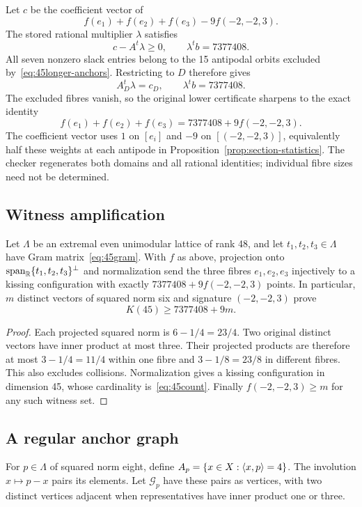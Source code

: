 Let $c$ be the coefficient vector of
\[
f(e_1)+f(e_2)+f(e_3)-9f(-2,-2,3).
\]
The stored rational multiplier $\lambda$ satisfies
\begin{equation}\label{eq:45dual}
c-A^t\lambda\ge0,\qquad \lambda^tb=7377408.
\end{equation}
All seven nonzero slack entries belong to the 15 antipodal orbits
excluded by~\eqref{eq:45longer-anchors}. Restricting to $D$ therefore gives
\[
A_D^t\lambda=c_D,\qquad\lambda^tb=7377408.
\]
The excluded fibres vanish, so the original lower certificate sharpens
to the exact identity
\begin{equation}\label{eq:45count}
f(e_1)+f(e_2)+f(e_3)=7377408+9f(-2,-2,3).
\end{equation}
The coefficient vector uses $1$ on $[e_i]$ and $-9$ on $[(-2,-2,3)]$,
equivalently half these weights at each antipode in
Proposition~\ref{prop:section-statistics}. The checker regenerates both
domains and all rational identities; individual fibre sizes need not be
determined.

\subsection{Witness amplification}
\begin{theorem}\label{thm:45-transfer}
Let $\Lambda$ be an extremal even unimodular lattice of rank 48,
and let $t_1,t_2,t_3\in\Lambda$ have Gram matrix~\eqref{eq:45gram}.
With $f$ as above, projection onto
$\operatorname{span}_{\mathbb R}\{t_1,t_2,t_3\}^\perp$ and normalization
send the three fibres $e_1,e_2,e_3$ injectively to a kissing
configuration with exactly $7377408+9f(-2,-2,3)$ points.
In particular, $m$ distinct vectors of squared norm six and signature
$(-2,-2,3)$ prove
\[
K(45)\ge7377408+9m.
\]
\end{theorem}
\begin{proof}
Each projected squared norm is $6-1/4=23/4$.
Two original distinct vectors have inner product at most three.
Their projected products are therefore at most $3-1/4=11/4$ within
one fibre and $3-1/8=23/8$ in different fibres. This also excludes
collisions. Normalization gives a kissing configuration in dimension
45, whose cardinality is~\eqref{eq:45count}. Finally
$f(-2,-2,3)\ge m$ for any such witness set.
\end{proof}

\subsection{A regular anchor graph}
For $p\in\Lambda$ of squared norm eight, define
$A_p=\{x\in X:\langle x,p\rangle=4\}$. The involution $x\mapsto p-x$
pairs its elements. Let $\mathcal G_p$ have these pairs as vertices,
with two distinct vertices adjacent when representatives have inner
product one or three.

